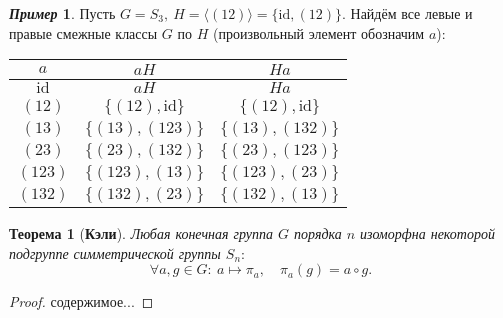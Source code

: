 \documentclass[a4paper, 14pt]{extarticle}
\newcommand{\n}{\par}
\newcommand{\id}{\mathrm{id}}
\theoremstyle{definition}
\newtheorem*{exmpl*}{\textit{Пример}}
\theoremstyle{plain}
\newtheorem*{theorem*}{Теорема}
\numberwithin{theorem}{section}
\numberwithin{definition}{section}
\numberwithin{statement}{section}
\numberwithin{lemma}{section}
\numberwithin{consequence}{section}
\begin{document}
	\newpage
	\begin{exmpl*}
		Пусть $G = S_3, \ H = \langle(12)\rangle = \{\id, (12)\}.$ Найдём все левые и правые смежные классы $G$ по $H$ (произвольный элемент обозначим $a$):
		\begin{center}
			\begin{tabular}{c|c|c}
				$a$ & $aH$ & $Ha$\\
				\hline
				$\id$ & $aH$ & $Ha$ \\
				\hline
				$(12)$ & $\{(12), \id\}$ & $\{(12), \id\}$ \\
				\hline
				$(13)$ & $\{(13), (123)\}$ & $\{(13), (132)\}$ \\
				\hline
				$(23)$ & $\{(23), (132)\}$ & $\{(23), (123)\}$ \\
				\hline
				$(123)$ & $\{(123), (13)\}$ & $\{(123), (23)\}$ \\
				\hline
				$(132)$ & $\{(132), (23)\}$ & $\{(132), (13)\}$
			\end{tabular}
		\end{center} \n
	\end{exmpl*}
	\begin{theorem*}[\textbf{Кэли}]
		Любая конечная группа $G$ порядка $n$ изоморфна некоторой подгруппе симметрической группы $S_n{:}$
		\begin{equation*}
			\forall a, g \in G{:} \ a \mapsto \pi_a, \quad \pi_a(g) = a \circ g.
		\end{equation*} \n
	\end{theorem*}
	\begin{proof}
		содержимое...
	\end{proof}
	\newpage
\end{document}
